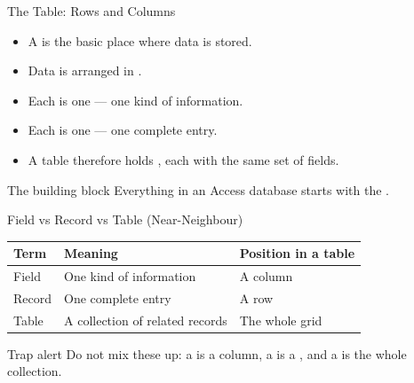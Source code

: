 \documentclass[aspectratio=169]{beamer}
\begin{document}
\begin{frame}{The Table: Rows and Columns}
  \begin{itemize}
    \item A  is the basic place where data is stored.
    \item Data is arranged in .
    \item Each  is one  --- one kind of information.
    \item Each  is one  --- one complete entry.
    \item A table therefore holds , each with the same set
      of fields.
  \end{itemize}
  \begin{block}{The building block}
    Everything in an Access database starts with the .
  \end{block}
\end{frame}

\begin{frame}{Field vs Record vs Table (Near-Neighbour)}
  \begin{center}
    \begin{tabular}{p{}p{}p{}}
      \toprule
      \textbf{Term} & \textbf{Meaning} & \textbf{Position in a table} \\
      \midrule
      Field & One kind of information & A column \\
      Record & One complete entry & A row \\
      Table & A collection of related records & The whole grid \\
      \bottomrule
    \end{tabular}
  \end{center}
  \vspace{0.25cm}
  \begin{alertblock}{Trap alert}
    Do not mix these up: a  is a column, a  is a
    , and a  is the whole collection.
  \end{alertblock}
\end{frame}
\end{document}
